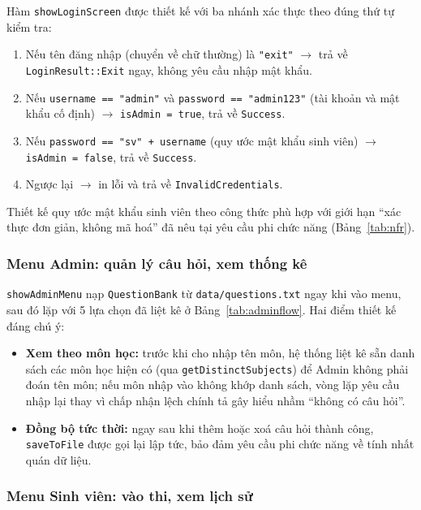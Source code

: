 \documentclass[11pt]{report}
\begin{document}
Hàm \texttt{showLoginScreen} được thiết kế với ba nhánh xác thực theo đúng thứ tự kiểm tra:

\begin{enumerate}[leftmargin=*, label=\arabic*.]
    \item Nếu tên đăng nhập (chuyển về chữ thường) là \texttt{"exit"} $\to$ trả về \texttt{LoginResult::Exit} ngay, không yêu cầu nhập mật khẩu.
    \item Nếu \texttt{username == "admin"} và \texttt{password == "admin123"} (tài khoản và mật khẩu cố định) $\to$ \texttt{isAdmin = true}, trả về \texttt{Success}.
    \item Nếu \texttt{password == "sv" + username} (quy ước mật khẩu sinh viên) $\to$ \texttt{isAdmin = false}, trả về \texttt{Success}.
    \item Ngược lại $\to$ in lỗi và trả về \texttt{InvalidCredentials}.
\end{enumerate}

Thiết kế quy ước mật khẩu sinh viên theo công thức phù hợp với giới hạn ``xác thực đơn giản, không mã hoá'' đã nêu tại yêu cầu phi chức năng (Bảng~\ref{tab:nfr}).

\subsubsection{Menu Admin: quản lý câu hỏi, xem thống kê}

\texttt{showAdminMenu} nạp \texttt{QuestionBank} từ \texttt{data/questions.txt} ngay khi vào menu, sau đó lặp với 5 lựa chọn đã liệt kê ở Bảng~\ref{tab:adminflow}. Hai điểm thiết kế đáng chú ý:

\begin{itemize}[leftmargin=*]
    \item \textbf{Xem theo môn học:} trước khi cho nhập tên môn, hệ thống liệt kê sẵn danh sách các môn học hiện có (qua \texttt{getDistinctSubjects}) để Admin không phải đoán tên môn; nếu môn nhập vào không khớp danh sách, vòng lặp yêu cầu nhập lại thay vì chấp nhận lệch chính tả gây hiểu nhầm ``không có câu hỏi''.
    \item \textbf{Đồng bộ tức thời:} ngay sau khi thêm hoặc xoá câu hỏi thành công, \texttt{saveToFile} được gọi lại lập tức, bảo đảm yêu cầu phi chức năng về tính nhất quán dữ liệu.
\end{itemize}

\subsubsection{Menu Sinh viên: vào thi, xem lịch sử}
\end{document}
